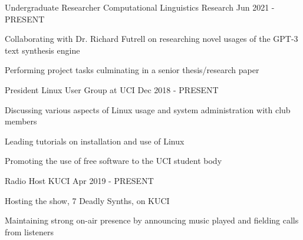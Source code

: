 
\begin{cventries}
	\cventry
	{Undergraduate Researcher}
	{Computational Linguistics Research}
	{}
	{Jun 2021 - PRESENT}
	{\begin{cvitems}
		\item{Collaborating with Dr. Richard Futrell on researching novel usages of the GPT-3 text synthesis engine}
		\item{Performing project tasks culminating in a senior thesis/research paper}	
	 \end{cvitems}
	}
	
	\cventry
	{President}
	{Linux User Group at UCI}
	{}
	{Dec 2018 - PRESENT}
	{\begin{cvitems}
		\item{Discussing various aspects of Linux usage and system administration with club members}
		\item{Leading tutorials on installation and use of Linux}
		\item{Promoting the use of free software to the UCI student body}
	 \end{cvitems}
 	}
 
	 \cventry
	 {Radio Host}
	 {KUCI}
	 {}
	 {Apr 2019 - PRESENT}
	 {
	 	\begin{cvitems}
	 		\item {Hosting the show, 7 Deadly Synths, on KUCI}
	 		\item {Maintaining strong on-air presence by announcing music played and fielding calls from listeners}
	 	\end{cvitems}
	 }
	
\end{cventries}
